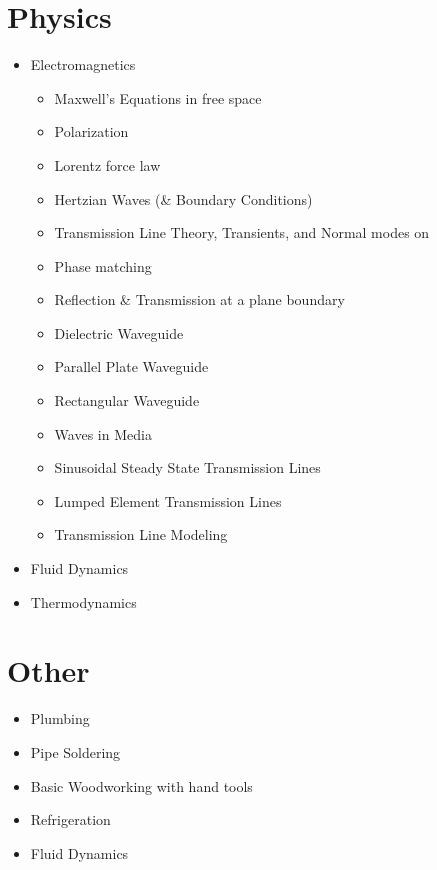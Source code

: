 \documentclass[a4paper]{article}
\begin{document}
\section{Physics}
\begin{itemize}
\item Electromagnetics
  \begin{itemize}
  \item Maxwell's Equations in free space
  \item Polarization
  \item Lorentz force law
  \item Hertzian Waves (\& Boundary Conditions)
  \item Transmission Line Theory, Transients, and Normal modes on
  \item Phase matching
  \item Reflection \& Transmission at a plane boundary
  \item Dielectric Waveguide
  \item Parallel Plate Waveguide
  \item Rectangular Waveguide
  \item Waves in Media
  \item Sinusoidal Steady State Transmission Lines
  \item Lumped Element Transmission Lines
  \item Transmission Line Modeling
  \end{itemize}
\item Fluid Dynamics
\item Thermodynamics
\end{itemize}

\section{Other}
\begin{itemize}
\item Plumbing
\item Pipe Soldering
\item Basic Woodworking with hand tools
\item Refrigeration
\item Fluid Dynamics
\end{itemize}
\end{document}

